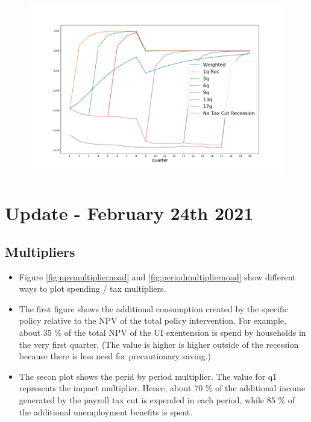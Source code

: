 \documentclass[]{article}
\begin{document}
\begin{figure}
	\centering
	\includegraphics[width=\linewidth]{../Full_Run_Mar5/Tax_Cut_Rec_Decomp_Rel_Baseline}
	\caption{}
	\label{fig:taxcutrecdecomprelbaseline}
\end{figure}


\FloatBarrier	
\section{Update - February 24th 2021}	
\FloatBarrier
\subsection{Multipliers}

\begin{itemize}
	\item Figure \ref{fig:npvmultipliernoad} and \ref{fig:periodmultipliernoad} show different ways to plot spending / tax multipliers.
	\item The first figure shows the additional consumption created by the specific policy relative to the NPV of the total policy intervention. For example, about 35 \% of the total NPV of the UI exentension is spend by households in the very first quarter. (The value is higher is higher outside of the recession because there is less need for precautionary saving.)
	\item The secon plot shows the perid by period multiplier. The value for q1 represents the impact multiplier. Hence, about 70 \% of the additional income generated by the payroll tax cut is expended in each period, while 85 \% of the additional unemployment benefits is spent.
\end{itemize}
\end{document}
